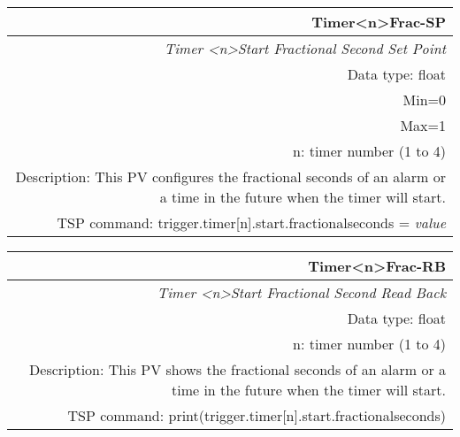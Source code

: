 \documentclass[openany]{article}
\begin{document}
		\begin{tabular}{N}
			\hline
			\bfseries Timer{\textless n\textgreater}Frac-SP\label{pv:timerfrac-sp} \\ \hline
			\emph{Timer \textless n\textgreater Start Fractional Second Set Point} \\
			Data type: float \\
			Min=0 \\
			Max=1 \\
			n: timer number (1 to 4) \\
			Description: This PV configures the fractional seconds of an alarm or a time in the future when the timer will start. \\
			TSP command: trigger.timer[n].start.fractionalseconds = \emph{value}
		\end{tabular}

		\begin{tabular}{N}
			\hline
			\bfseries Timer{\textless n\textgreater}Frac-RB\label{pv:timerfrac-rb} \\ \hline
			\emph{Timer \textless n\textgreater Start Fractional Second Read Back} \\
			Data type: float \\
			n: timer number (1 to 4) \\
			Description: This PV shows the fractional seconds of an alarm or a time in the future when the timer will start. \\
			TSP command: print(trigger.timer[n].start.fractionalseconds)
		\end{tabular}
\end{document}
